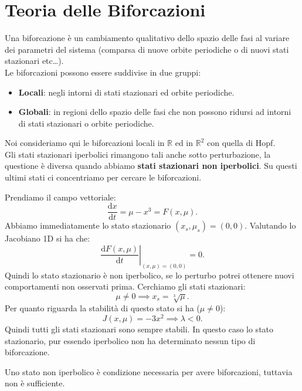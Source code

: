 \section{Teoria delle Biforcazioni}%
Una biforcazione è un cambiamento qualitativo dello spazio delle fasi al variare dei parametri del sistema (comparsa di nuove orbite periodiche o di nuovi stati stazionari etc\ldots).\\
Le biforcazioni possono essere suddivise in due gruppi:
\begin{itemize}
    \item \textbf{Locali}: negli intorni di stati stazionari ed orbite periodiche.
    \item \textbf{Globali}: in regioni dello spazio delle fasi che non possono ridursi ad intorni di stati stazionari o orbite periodiche.
\end{itemize}
Noi consideriamo qui le biforcazioni locali in $\mathbb{R}$ ed in $\mathbb{R}^2$ con quella di Hopf.\\
Gli stati stazionari iperbolici rimangono tali anche sotto perturbazione, la questione è diversa quando abbiamo \textbf{stati stazionari non iperbolici}. Su questi ultimi stati ci concentriamo per cercare le biforcazioni.
\begin{exmp}
    Prendiamo il campo vettoriale:
    \[
	\frac{\text{d} x}{\text{d} t} = \mu-x^3=F(x, \mu) 
    .\] 
    Abbiamo immediatamente lo stato stazionario $(x_s, \mu_s) = (0, 0)$. Valutando lo Jacobiano 1D si ha che:
    \[
	\left.\frac{\text{d} F(x, \mu) }{\text{d} t} \right|_{(x, \mu) = (0,0)}=0
    .\] 
    Quindi lo stato stazionario è non iperbolico, se lo perturbo potrei ottenere nuovi comportamenti non osservati prima. Cerchiamo gli stati stazionari:
    \[
	\mu\neq 0\implies x_s = \sqrt[3]{\mu} 
    .\] 
    Per quanto riguarda la stabilità di questo stato si ha ($\mu\neq 0$):
    \[
	J(x, \mu) = -3x^2 \implies  \lambda  < 0
    .\] 
    Quindi tutti gli stati stazionari sono sempre stabili. In questo caso lo stato stazionario, pur essendo iperbolico non ha determinato nessun tipo di biforcazione.
\end{exmp}
\noindent
Uno stato non iperbolico è condizione necessaria per avere biforcazioni, tuttavia non è sufficiente.
